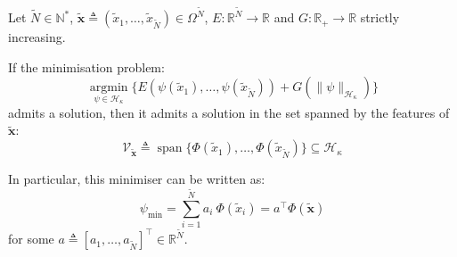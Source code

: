 \begin{proposition}\label{th:representer}
	Let $\tilde{N}\in\mathbb{N}^*$, $\tilde{\mathbf{x}}\triangleq(\tilde{x}_1,\dots,\tilde{x}_{\tilde{N}})\in\Omega^{\tilde{N}}$, $E:\mathbb{R}^{\tilde{N}}\to\mathbb{R}$ and $G:\mathbb{R}_+\to\mathbb{R}$ strictly increasing.

	If the minimisation problem:
	\begin{equation}
		\underset{\psi\in\mathcal{H}_\kappa}{\operatorname{argmin}}\{E(\psi(\tilde{x}_1),\dots,\psi(\tilde{x}_{\tilde{N}}))+G(\|\psi\|_{\mathcal{H}_\kappa})\}\label{eq:RKHS_minimisation}
	\end{equation}
	admits a solution, then it admits a solution in the set spanned by the features of $\tilde{\mathbf{x}}$:
	\begin{equation}
		\mathcal{V}_{\tilde{\mathbf{x}}}\triangleq\operatorname{span}\{\Phi(\tilde{x}_1),\dots,\Phi(\tilde{x}_{\tilde{N}})\}\subseteq\mathcal{H}_\kappa
	\end{equation}

	In particular, this minimiser can be written as:
	\begin{equation}
		\psi_{\min}=\sum_{i=1}^{\tilde{N}}a_i\:\Phi(\tilde{x}_i)=a^\top\Phi(\tilde{\mathbf{x}})
	\end{equation}
	for some $a\triangleq[a_1,\dots,a_{\tilde{N}}]^\top\in\mathbb{R}^{\tilde{N}}$.
\end{proposition}

